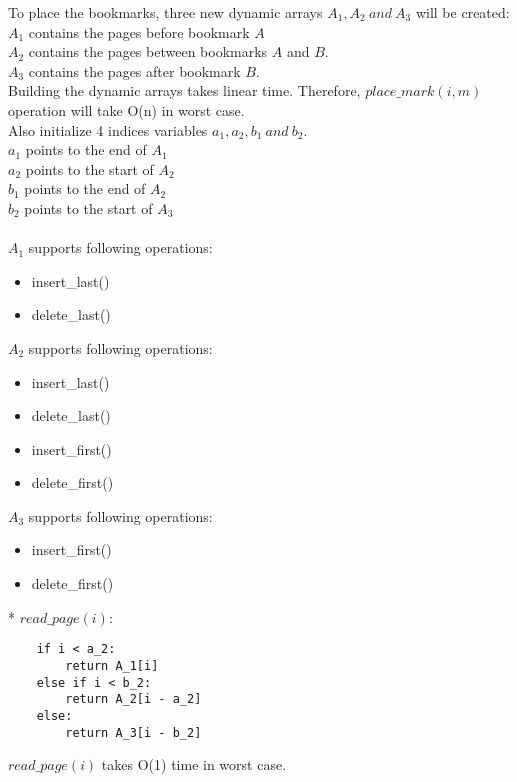 \documentclass[12pt,twoside]{article}
\begin{document}
\begin{problems}
To place the bookmarks, three new dynamic arrays $A_1, A_2\ and\  A_3$ will be created: \\
$A_1$ contains the pages before bookmark $A$ \\
$A_2$ contains the pages between bookmarks $A$ and $B$. \\
$A_3$ contains the pages after bookmark $B$. \\

Building the dynamic arrays takes linear time. Therefore, $place\_mark(i, m)$ operation will take O(n) in worst case. \\

Also initialize 4 indices variables $a_1, a_2, b_1\ and\ b_2$. \\
$a_1$ points to the end of $A_1$ \\
$a_2$ points to the start of $A_2$ \\
$b_1$ points to the end of $A_2$ \\
$b_2$ points to the start of $A_3$ \\
\\
$A_1$ supports following operations:
\begin{itemize}
    \item insert\_last()
    \item delete\_last()
\end{itemize}

$A_2$ supports following operations: 
\begin{itemize}
    \item insert\_last()
    \item delete\_last()
    \item insert\_first()
    \item delete\_first()
\end{itemize}

$A_3$ supports following operations:
\begin{itemize}
    \item insert\_first()
    \item delete\_first()
\end{itemize}

\newpage
* $read\_page(i)$: 
\begin{lstlisting}
    if i < a_2:
        return A_1[i]
    else if i < b_2:
        return A_2[i - a_2]
    else:
        return A_3[i - b_2]
\end{lstlisting}

$read\_page(i)$ takes O(1) time in worst case. \\


\end{problems}
\end{document}
